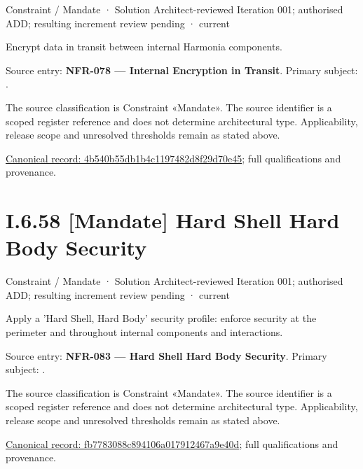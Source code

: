 \label{element:4b540b55db1b4c1197482d8f29d70e45}
{\small Constraint / Mandate · Solution Architect-reviewed Iteration 001; authorised ADD; resulting increment review pending · current}\par

Encrypt data in transit between internal Harmonia components.



Source entry: \textbf{NFR-078 — Internal Encryption in Transit}. Primary subject: \texttt{}.



The source classification is Constraint «Mandate». The source identifier is a scoped register reference and does not determine architectural type. Applicability, release scope and unresolved thresholds remain as stated above.


{\footnotesize \href{../../../../continuum/motivation/constraint/mandate/4b540b55db1b4c1197482d8f29d70e45.md}{Canonical record: 4b540b55db1b4c1197482d8f29d70e45}; full qualifications and provenance.}\par
\section*{I.6.58 [Mandate] Hard Shell Hard Body Security}
\label{navigation:I.6.58}

\label{element:fb7783088c894106a017912467a9e40d}
{\small Constraint / Mandate · Solution Architect-reviewed Iteration 001; authorised ADD; resulting increment review pending · current}\par

Apply a 'Hard Shell, Hard Body' security profile: enforce security at the perimeter and throughout internal components and interactions.



Source entry: \textbf{NFR-083 — Hard Shell Hard Body Security}. Primary subject: \texttt{}.



The source classification is Constraint «Mandate». The source identifier is a scoped register reference and does not determine architectural type. Applicability, release scope and unresolved thresholds remain as stated above.


{\footnotesize \href{../../../../continuum/motivation/constraint/mandate/fb7783088c894106a017912467a9e40d.md}{Canonical record: fb7783088c894106a017912467a9e40d}; full qualifications and provenance.}\par
